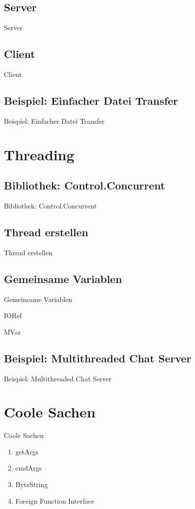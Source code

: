 \documentclass{beamer}
\begin{document}
\subsection{Server}
\begin{frame}{Server}
\end{frame}

\subsection{Client}
\begin{frame}{Client}
\end{frame}

\subsection{Beispiel: Einfacher Datei Transfer}
\begin{frame}{Beispiel: Einfacher Datei Transfer}
\end{frame}

\section{Threading}
\subsection{Bibliothek: Control.Concurrent}
\begin{frame}{Bibliothek: Control.Concurrent}
\end{frame}

\subsection{Thread erstellen}
\begin{frame}{Thread erstellen}
\end{frame}

\subsection{Gemeinsame Variablen}
\begin{frame}{Gemeinsame Variablen}
\end{frame}

\begin{frame}{IORef}
\end{frame}

\begin{frame}{MVar}
\end{frame}

\subsection{Beispiel: Multithreaded Chat Server}
\begin{frame}{Beispiel: Multithreaded Chat Server}
\end{frame}

\section{Coole Sachen}
\begin{frame}{Coole Sachen}
\begin{enumerate}
\item getArgs
\item cmdArgs
\item ByteString
\item Foreign Function Interface
\end{enumerate}
\end{frame}
\end{document}
